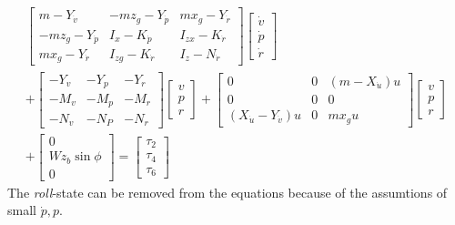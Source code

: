 		\begin{equation}
			\begin{aligned}
				\left [ \begin{array}{ccc}
					m - Y_{\dot{v}} & - m z_g - Y_{\dot{p}} & m x_g - Y_{\dot{r}} \\
					-m z_g - Y_{\dot{p}} & I_x - K_{\dot{p}} & I_{zx} - K_{\dot{r}} \\
					m x_g - Y_{\dot{r}} & I_{zg} - K_{\dot{r}} & I_z - N_{\dot{r}} 
					\end{array} \right]
				\left [ \begin{array}{c}
					\dot{v} \\
					\dot{p} \\
					\dot{r} 
					\end{array} \right] \\
				+ \left [ \begin{array}{ccc}
					-Y_v	&	-Y_p 	&	-Y_r \\
					-M_v	&	-M_p	&	-M_r \\
					-N_v	&	-N_P	&	-N_r
					\end{array} \right]
				\left [ \begin{array}{c}
					v \\
					p \\
					r 
				\end{array} \right] + 
				\left [ \begin{array}{ccc} 
					0 & 0 & (m - X_{\dot{u}})u \\
					0 & 0 &  0 \\
					(X_{\dot{u}} - Y_{\dot{v}}) u & 0 & m x_g u 
					\end{array} \right]	
				\left [ \begin{array}{c}
					v \\
					p \\
					r 
				\end{array} \right] \\
				+  \left [ \begin{array}{c}
					0 \\
					W z_b \sin \phi \\
					0 
					\end{array} \right] = \left [ \begin{array}{c}
									\tau_2 \\
									\tau_4 \\
									\tau_6
								      \end{array} \right ]
			\end{aligned}
		\end{equation}
		The \textit{roll}-state can be removed from the equations because of the assumtions of small
		$\dot{p}, p$. 


